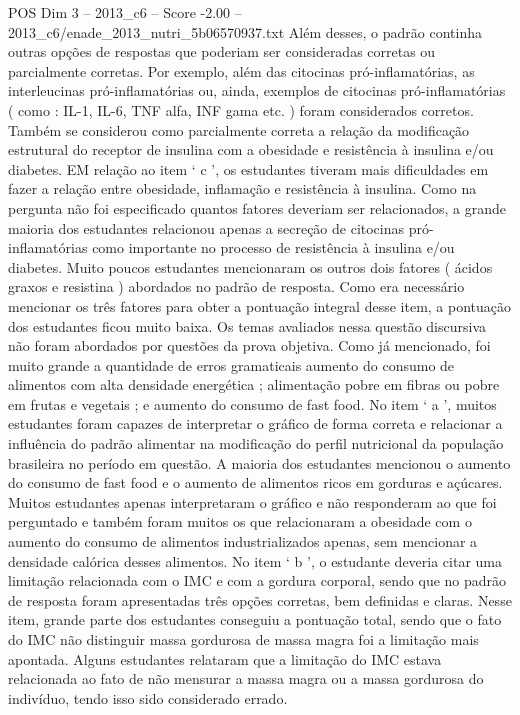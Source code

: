 \begin{textsample}{POS Dim 3 – 2013\_c6 – Score -2.00 – 2013\_c6/enade\_2013\_nutri\_5b06570937.txt}
Além desses, o padrão continha outras opções de respostas que poderiam ser consideradas corretas ou parcialmente corretas.
Por exemplo, além das citocinas pró-inflamatórias, as interleucinas pró-inflamatórias ou, ainda, exemplos de citocinas pró-inflamatórias ( como : IL-1, IL-6, TNF alfa, INF gama etc. ) foram considerados corretos.
Também se considerou como parcialmente correta a relação da modificação estrutural do receptor de insulina com a obesidade e resistência à insulina e/ou diabetes.
EM relação ao item ‘ c ’, os estudantes tiveram mais dificuldades em fazer a relação entre obesidade, inflamação e resistência à insulina.
Como na pergunta não foi especificado quantos fatores deveriam ser relacionados, a grande maioria dos estudantes relacionou apenas a secreção de citocinas pró-inflamatórias como importante no processo de resistência à insulina e/ou diabetes.
Muito poucos estudantes mencionaram os outros dois fatores ( ácidos graxos e resistina ) abordados no padrão de resposta.
Como era necessário mencionar os três fatores para obter a pontuação integral desse item, a pontuação dos estudantes ficou muito baixa.
Os temas avaliados nessa questão discursiva não foram abordados por questões da prova objetiva.
Como já mencionado, foi muito grande a quantidade de erros gramaticais aumento do consumo de alimentos com alta densidade energética ; alimentação pobre em fibras ou pobre em frutas e vegetais ; e aumento do consumo de fast food.
No item ‘ a ’, muitos estudantes foram capazes de interpretar o gráfico de forma correta e relacionar a influência do padrão alimentar na modificação do perfil nutricional da população brasileira no período em questão.
A maioria dos estudantes mencionou o aumento do consumo de fast food e o aumento de alimentos ricos em gorduras e açúcares.
Muitos estudantes apenas interpretaram o gráfico e não responderam ao que foi perguntado e também foram muitos os que relacionaram a obesidade com o aumento do consumo de alimentos industrializados apenas, sem mencionar a densidade calórica desses alimentos.
No item ‘ b ’, o estudante deveria citar uma limitação relacionada com o IMC e com a gordura corporal, sendo que no padrão de resposta foram apresentadas três opções corretas, bem definidas e claras.
Nesse item, grande parte dos estudantes conseguiu a pontuação total, sendo que o fato do IMC não distinguir massa gordurosa de massa magra foi a limitação mais apontada.
Alguns estudantes relataram que a limitação do IMC estava relacionada ao fato de não mensurar a massa magra ou a massa gordurosa do indivíduo, tendo isso sido considerado errado.

\end{textsample}
